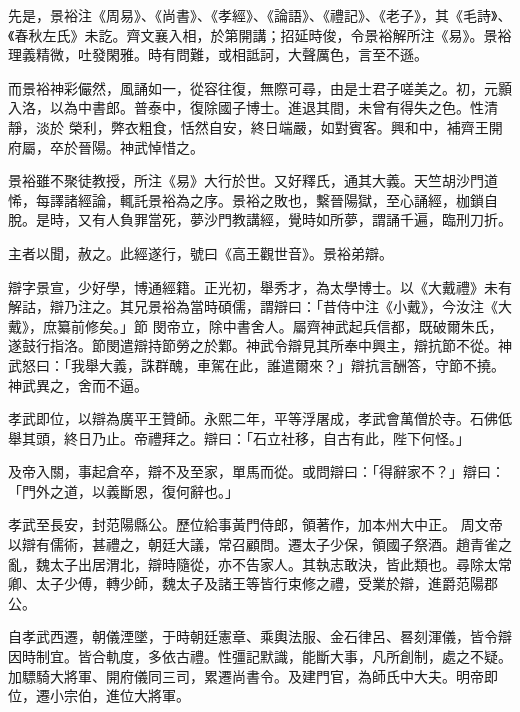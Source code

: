 \begin{pinyinscope}
 先是，景裕注《周易》、《尚書》、《孝經》、《論語》、《禮記》、《老子》，其《毛詩》、《春秋左氏》未訖。齊文襄入相，於第開講；招延時俊，令景裕解所注《易》。景裕理義精微，吐發閑雅。時有問難，或相詆訶，大聲厲色，言至不遜。



 而景裕神彩儼然，風誦如一，從容往復，無際可尋，由是士君子嗟美之。初，元顥入洛，以為中書郎。普泰中，復除國子博士。進退其間，未曾有得失之色。性清靜，淡於
 榮利，弊衣粗食，恬然自安，終日端嚴，如對賓客。興和中，補齊王開府屬，卒於晉陽。神武悼惜之。



 景裕雖不聚徒教授，所注《易》大行於世。又好釋氏，通其大義。天竺胡沙門道悕，每譯諸經論，輒託景裕為之序。景裕之敗也，繫晉陽獄，至心誦經，枷鎖自脫。是時，又有人負罪當死，夢沙門教講經，覺時如所夢，謂誦千遍，臨刑刀折。



 主者以聞，赦之。此經遂行，號曰《高王觀世音》。景裕弟辯。



 辯字景宣，少好學，博通經籍。正光初，舉秀才，為太學博士。以《大戴禮》未有解詁，辯乃注之。其兄景裕為當時碩儒，謂辯曰：「昔侍中注《小戴》，今汝注《大戴》，庶纂前修矣。」節
 閔帝立，除中書舍人。屬齊神武起兵信都，既破爾朱氏，遂鼓行指洛。節閔遣辯持節勞之於鄴。神武令辯見其所奉中興主，辯抗節不從。神武怒曰：「我舉大義，誅群醜，車駕在此，誰遣爾來？」辯抗言酬答，守節不撓。神武異之，舍而不逼。



 孝武即位，以辯為廣平王贊師。永熙二年，平等浮屠成，孝武會萬僧於寺。石佛低舉其頭，終日乃止。帝禮拜之。辯曰：「石立社移，自古有此，陛下何怪。」



 及帝入關，事起倉卒，辯不及至家，單馬而從。或問辯曰：「得辭家不？」辯曰：「門外之道，以義斷恩，復何辭也。」



 孝武至長安，封范陽縣公。歷位給事黃門侍郎，領著作，加本州大中正。
 周文帝以辯有儒術，甚禮之，朝廷大議，常召顧問。遷太子少保，領國子祭酒。趙青雀之亂，魏太子出居渭北，辯時隨從，亦不告家人。其執志敢決，皆此類也。尋除太常卿、太子少傅，轉少師，魏太子及諸王等皆行束修之禮，受業於辯，進爵范陽郡公。



 自孝武西遷，朝儀湮墜，于時朝廷憲章、乘輿法服、金石律呂、晷刻渾儀，皆令辯因時制宜。皆合軌度，多依古禮。性彊記默識，能斷大事，凡所創制，處之不疑。加驃騎大將軍、開府儀同三司，累遷尚書令。及建門官，為師氏中大夫。明帝即位，遷小宗伯，進位大將軍。




\end{pinyinscope}
